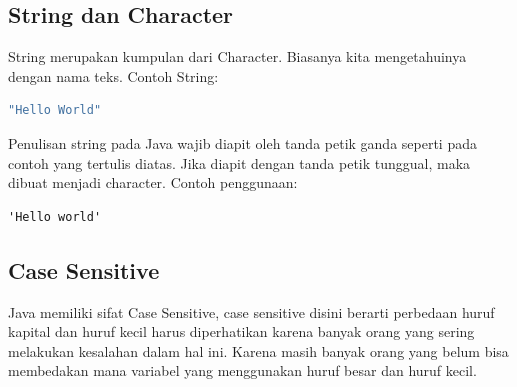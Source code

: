 \subsection{String dan Character}
String merupakan kumpulan dari Character. Biasanya kita mengetahuinya dengan nama teks. Contoh String:
\begin{lstlisting}[language=Java]
"Hello World"
\end{lstlisting}

Penulisan string pada Java wajib diapit oleh tanda petik ganda seperti pada contoh yang tertulis diatas. Jika diapit dengan tanda petik tunggual, maka dibuat menjadi character. Contoh penggunaan:
\begin{lstlisting}
'Hello world'
\end{lstlisting}


\subsection{Case Sensitive}
Java memiliki sifat Case Sensitive, case sensitive disini berarti perbedaan huruf kapital dan huruf kecil harus diperhatikan karena banyak orang yang sering melakukan kesalahan dalam hal ini. Karena masih banyak orang yang belum bisa membedakan mana variabel yang menggunakan huruf besar dan huruf kecil.

